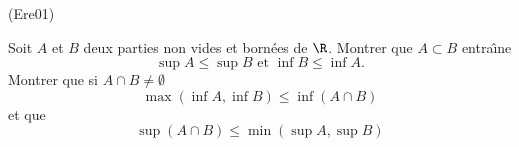 \begin{tiny}(Ere01)\end{tiny} Soit $A$ et $B$ deux parties non vides et born{\'e}es de $\R$. Montrer que $A\subset B$ entra\^{\i }ne
\[
\sup A\leq \sup B\text{ et }\inf B\leq \inf A.
\]
Montrer que si $A\cap B\neq \emptyset$
\[
\max (\inf A,\inf B)\leq \inf (A\cap B)
\]
et que
\[
\sup (A\cap B)\leq \min (\sup A,\sup B)
\]